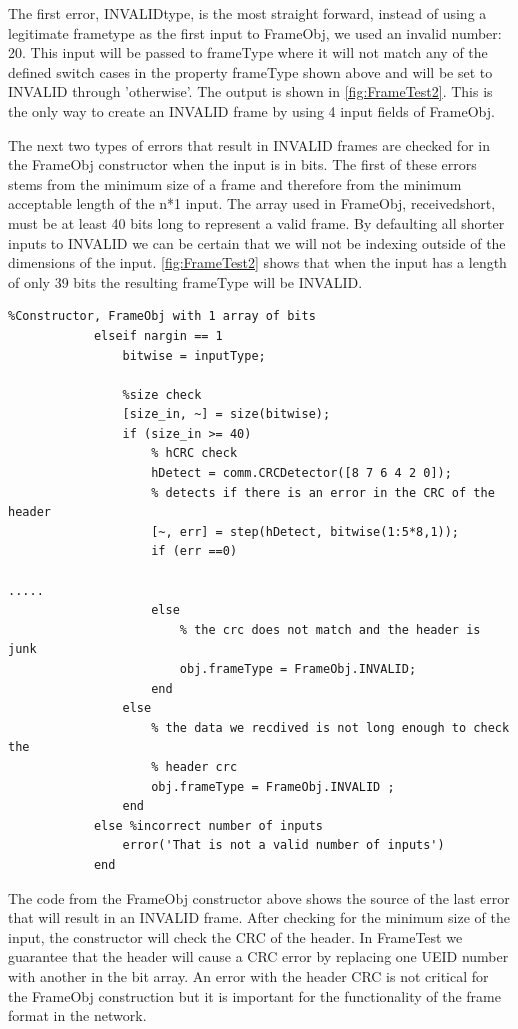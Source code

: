 The first error, INVALIDtype, is the most straight forward, instead of using a legitimate frametype as the first input to FrameObj, we used an invalid number: 20. This input will be passed to frameType where it will not match any of the defined switch cases in the property frameType shown above and will be set to INVALID through 'otherwise'. The output is shown in \ref{fig:FrameTest2}.  This is the only way to create an INVALID frame by using 4 input fields of FrameObj. 

The next two types of errors that result in INVALID frames are checked for in the FrameObj constructor when the input is in bits. The first of these errors stems from the minimum size of a frame and therefore from the minimum acceptable length of the n*1 input. The array used in FrameObj, receivedshort,  must be at least 40 bits long to represent a valid frame. By defaulting all shorter inputs to INVALID we can be certain that we will not be indexing outside of the dimensions of the input. \ref{fig:FrameTest2} shows that when the input has a length of only 39 bits the resulting frameType will be INVALID. 
\begin{lstlisting} 
%Constructor, FrameObj with 1 array of bits
            elseif nargin == 1
                bitwise = inputType;
                 
                %size check
                [size_in, ~] = size(bitwise);
                if (size_in >= 40)
                    % hCRC check
                    hDetect = comm.CRCDetector([8 7 6 4 2 0]);
                    % detects if there is an error in the CRC of the header
                    [~, err] = step(hDetect, bitwise(1:5*8,1));
                    if (err ==0)
																						.....
                    else
                        % the crc does not match and the header is junk
                        obj.frameType = FrameObj.INVALID;
                    end
                else
                    % the data we recdived is not long enough to check the
                    % header crc
                    obj.frameType = FrameObj.INVALID ;     
                end
            else %incorrect number of inputs
                error('That is not a valid number of inputs')
            end
\end{lstlisting} 

The code from the FrameObj constructor above shows the source of the last error that will result in an INVALID frame. After checking for the minimum size of the input, the constructor will check the CRC of the header. In FrameTest we guarantee that the header will cause a CRC error by replacing one UEID number with another in the bit array. An error with the header CRC is not critical for the FrameObj construction but it is important for the functionality of the frame format in the network.

